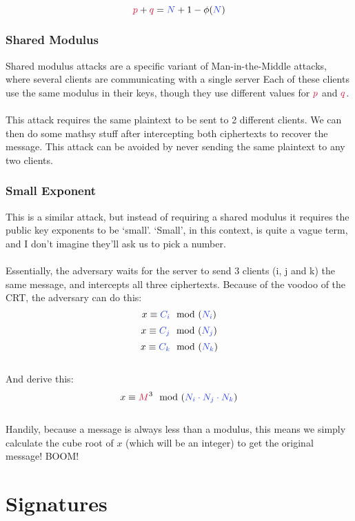 			$$ \cp + \cq = \cN + 1 - \phi(\cN) $$

		\subsubsection{Shared Modulus}

		Shared modulus attacks are a specific variant of Man-in-the-Middle attacks, where several clients are communicating with a single server Each of these clients use the same modulus in their keys, though they use different values for $\cp$ and $\cq$.\\
		\\
		This attack requires the same plaintext to be sent to 2 different clients. We can then do some mathsy stuff after intercepting both ciphertexts to recover the message. This attack can be avoided by never sending the same plaintext to any two clients.

		\subsubsection{Small Exponent}

		This is a similar attack, but instead of requiring a shared modulus it requires the public key exponents to be `small'. `Small', in this context, is quite a vague term, and I don't imagine they'll ask us to pick a number.\\
		\\
		Essentially, the adversary waits for the server to send 3 clients (i, j and k) the same message, and intercepts all three ciphertexts. Because of the voodoo of the CRT, the adversary can do this:\\
		$$
		x \equiv \blue{C_{i}} \mod (\blue{N_{i}})
		$$
		$$
		x \equiv \blue{C_{j}} \mod (\blue{N_{j}})
		$$
		$$
		x \equiv \blue{C_{k}} \mod (\blue{N_{k}})
		$$\\
		And derive this:\\
		$$
		x \equiv \red{M}^{3} \mod (\blue{N_{i} \cdot N_{j} \cdot N_{k}})
		$$\\
		Handily, because a message is always less than a modulus, this means we simply calculate the cube root of $x$ (which will be an integer) to get the original message! BOOM!


\section{Signatures}
